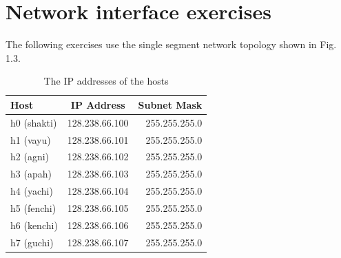 \documentclass[10pt,a4paper]{article}
\numberwithin{equation}{section}
\numberwithin{figure}{section}
\numberwithin{table}{section}
\begin{document}
\section*{Network interface exercises}
    The following exercises use the single segment network topology shown in Fig. 1.3.
    \begin{center}
        \begin{minipage}{0.48\textwidth}
            \begin{flushleft}
                \begin{table}[H]
                    \caption{The IP addresses of the hosts}
                    \vspace{5pt}
                    \centering
                    \begin{tabular}{ l c r }
                        \hline \hline
                        Host & IP Address & Subnet Mask \\
                        \hline 
                        h0 (shakti) & 128.238.66.100 & 255.255.255.0 \\
                        h1 (vayu) & 128.238.66.101 & 255.255.255.0 \\
                        h2 (agni) & 128.238.66.102 & 255.255.255.0 \\
                        h3 (apah) & 128.238.66.103 & 255.255.255.0 \\
                        h4 (yachi) & 128.238.66.104 & 255.255.255.0 \\
                        h5 (fenchi) & 128.238.66.105 & 255.255.255.0 \\
                        h6 (kenchi) & 128.238.66.106 & 255.255.255.0 \\
                        h7 (guchi) & 128.238.66.107 & 255.255.255.0 \\
                        \hline \hline
                        \end{tabular}
                \end{table}            
            \end{flushleft}
        \end{minipage}
        \begin{minipage}{0.48\textwidth}
            \begin{flushright}
                \begin{figure}[H]
                    \centering
\end{figure}
\end{flushright}
\end{minipage}
\end{center}
\end{document}

